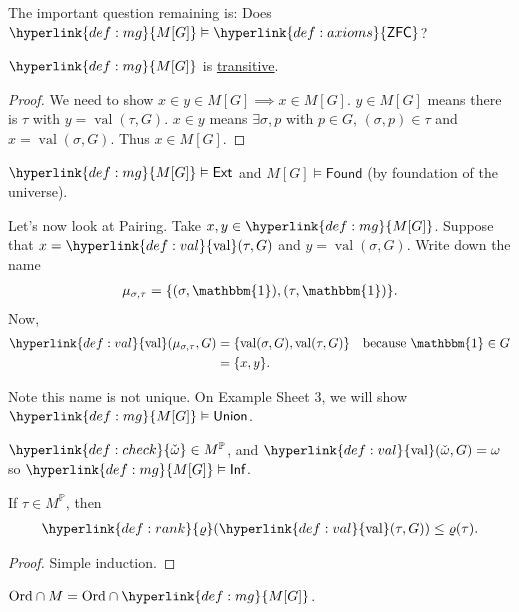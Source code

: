 \documentclass{article}
\newcommand{\1}{\mathbbm{1}}
\DeclareMathOperator{\val}{val}
\let\models\vDash
\begin{document}
The important question remaining is: Does $\hyperlink{def:mg}{M[G]} \models \hyperlink{def:axioms}{\textsf{ZFC}}$?
\begin{lemma}
  $\hyperlink{def:mg}{M[G]}$ is \hyperlink{def:transitive}{transitive}.
\end{lemma}
\begin{proof}
  We need to show $x \in y \in M[G] \implies x \in M[G]$.
  $y \in M[G]$ means there is $\tau$ with $y = \val(\tau,G)$.
  $x \in y$ means $\exists \sigma,p$ with $p \in G$, $(\sigma,p) \in \tau$ and $x = \val(\sigma,G)$.
  Thus $x \in M[G]$.
\end{proof}
\begin{cor}
  $\hyperlink{def:mg}{M[G] }\models \textsf{Ext}$ and $M[G] \models \textsf{Found}$ (by foundation of the universe).
\end{cor}
Let's now look at Pairing. Take $x,y \in \hyperlink{def:mg}{M[G]}$.
Suppose that $x = \hyperlink{def:val}{\val}(\tau,G)$ and $y = \val(\sigma,G)$.
Write down the name
\begin{align*}
  \mu_{\sigma,\tau} = \{(\sigma,\mathbbm{1}), (\tau,\mathbbm{1})\}.
\end{align*}
Now,
\begin{align*}
  \hyperlink{def:val}{\val}(\mu_{\sigma,\tau},G) &= \{\val(\sigma,G),\val(\tau,G)\} \quad \text{because } \mathbbm{1} \in G \\
                            &= \{x,y\}.
\end{align*}
Note this name is not unique.
On Example Sheet 3, we will show $\hyperlink{def:mg}{M[G]} \models \textsf{Union}$.
\begin{cor}
  $\hyperlink{def:check}{\check{\omega}} \in M^{\mathbb{P}}$, and $\hyperlink{def:val}{\val}(\check{\omega},G) = \omega$ so $\hyperlink{def:mg}{M[G]} \models \textsf{Inf}$.
\end{cor}
\begin{lemma}
  If $\tau \in M^{\mathbb{P}}$, then
  \begin{align*}
    \hyperlink{def:rank}{\varrho}(\hyperlink{def:val}{\val}(\tau,G)) \leq \varrho(\tau).
  \end{align*}
\end{lemma}
\begin{proof}
  Simple induction.
\end{proof}
\begin{cor}
  $\text{Ord} \cap M = \text{Ord} \cap \hyperlink{def:mg}{M[G]}$.
\end{cor}
\end{document}
